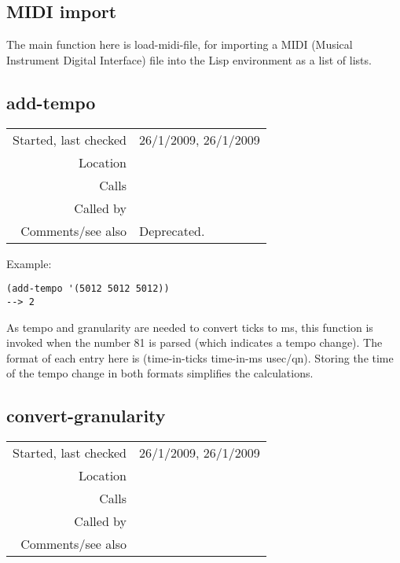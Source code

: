 \subsection{MIDI import}\label{sec:MIDI-import}

The main function here is load-midi-file, for
importing a MIDI (Musical Instrument Digital
Interface) file into the Lisp environment as a list of
lists.


\subsection*{add-tempo}\label{fun:add-tempo}

\vspace{0.3cm}
\begin{tabular}{r|p{8cm}}
Started, last checked & 26/1/2009, 26/1/2009 \\
Location & \nameref{sec:MIDI-import} \\
Calls & \\
Called by & \\
Comments/see also & Deprecated.
\end{tabular}

\vspace{0.5cm}
\noindent Example:
\begin{verbatim}
(add-tempo '(5012 5012 5012))
--> 2
\end{verbatim}

\noindent As tempo and granularity are needed to
convert ticks to ms, this function is invoked when the
number 81 is parsed (which indicates a tempo
change). The format of each entry here is
(time-in-ticks time-in-ms usec/qn). Storing the time
of the tempo change in both formats simplifies the
calculations.


\subsection*{convert-granularity}\label{fun:convert-granularity}

\vspace{0.3cm}
\begin{tabular}{r|p{8cm}}
Started, last checked & 26/1/2009, 26/1/2009 \\
Location & \nameref{sec:MIDI-import} \\
Calls & \\
Called by & \nameref{fun:get-header} \\
Comments/see also &
\end{tabular}


